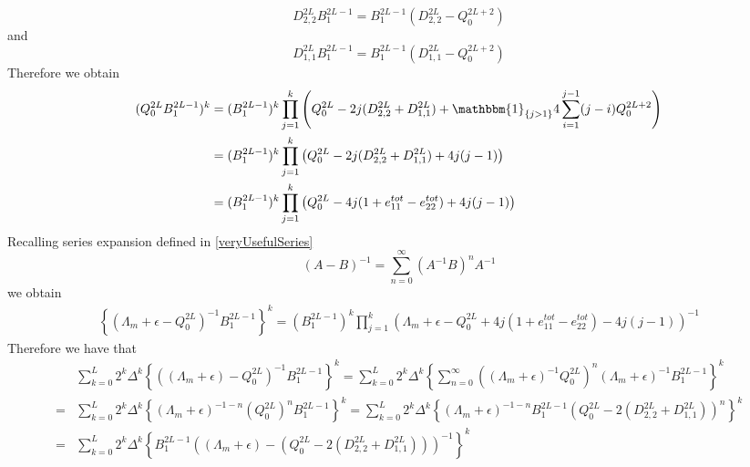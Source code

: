 \documentclass[10pt]{article}
\numberwithin{equation}{section}
\numberwithin{equation}{subsection}
\begin{document}
\begin{equation}
	D_{2,2}^{2L}B_{1}^{2L-1}=B_{1}^{2L-1}\left(D_{2,2}^{2L}-Q_{0}^{2L+2}\right)
\end{equation}
and 
\begin{equation}
	D_{1,1}^{2L}B_{1}^{2L-1}=B_{1}^{2L-1}\left(D_{1,1}^{2L}-Q_{0}^{2L+2}\right)
\end{equation}
Therefore we obtain 
\begin{equation}\label{exchangeQk}
	\begin{split}
		(Q_{0}^{2L}B_{1}^{2L-1})^{k}&=(B_{1}^{2L-1})^{k}\prod_{j=1}^{k}\left(Q_{0}^{2L}-2j(D_{2,2}^{2L}+D_{1,1}^{2L})+\mathbbm{1}_{\{j>1\}}4\sum_{i=1}^{j-1}(j-i)Q_{0}^{2L+2}\right)\\
		&=(B_{1}^{2L-1})^{k}\prod_{j=1}^{k}\left(Q_{0}^{2L}-2j(D_{2,2}^{2L}+D_{1,1}^{2L})+4j(j-1)\right)\\
		&=(B_{1}^{2L-1})^{k}\prod_{j=1}^{k}\left(Q_{0}^{2L}-4j(1+e_{11}^{tot}-e_{22}^{tot})+4j(j-1)\right)
	\end{split}
\end{equation}
Recalling series expansion defined in \eqref{veryUsefulSeries}
\begin{equation}
	(A-B)^{-1}=\sum_{n=0}^{\infty}(A^{-1}B)^{n}A^{-1}
\end{equation}
we obtain 
\begin{equation}
	\begin{split}
		\left\{(\Lambda_{m}+\epsilon-Q_{0}^{2L})^{-1}B_{1}^{2L-1}\right\}^{k}
		=(B_{1}^{2L-1})^{k}\prod_{j=1}^{k}\left(\Lambda_{m}+\epsilon-Q_{0}^{2L}+4j(1+e_{11}^{tot}-e_{22}^{tot})-4j(j-1)\right)^{-1}
	\end{split}
\end{equation}
Therefore we have that 
\begin{equation}\label{intermediate-Wgl2}
	\begin{split}
		&\sum_{k=0}^{L}2^{k}\Delta^{k}\left\{\left((\Lambda_{m}+\epsilon)-Q_{0}^{2L}\right)^{-1}B_{1}^{2L-1}\right\}^{k}=\sum_{k=0}^{L}2^{k}\Delta^{k}\left\{\sum_{n=0}^{\infty}\left((\Lambda_{m}+\epsilon)^{-1}Q_{0}^{2L}\right)^{n}(\Lambda_{m}+\epsilon)^{-1}B_{1}^{2L-1}\right\}^{k}\\
		=&
		\sum_{k=0}^{L}2^{k}\Delta^{k}\left\{(\Lambda_{m}+\epsilon)^{-1-n}(Q_{0}^{2L})^{n}B_{1}^{2L-1}\right\}^{k}=\sum_{k=0}^{L}2^{k}\Delta^{k}\left\{(\Lambda_{m}+\epsilon)^{-1-n}B_{1}^{2L-1}\left(Q_{0}^{2L}-2(D_{2,2}^{2L}+D_{1,1}^{2L})\right)^{n}\right\}^{k}
		\\=&
		\sum_{k=0}^{L}2^{k}\Delta^{k}\left\{B_{1}^{2L-1}\left((\Lambda_{m}+\epsilon)-\left(Q_{0}^{2L}-2(D_{2,2}^{2L}+D_{1,1}^{2L})\right)\right)^{-1}\right\}^{k}
	\end{split}
\end{equation}
\end{document}
